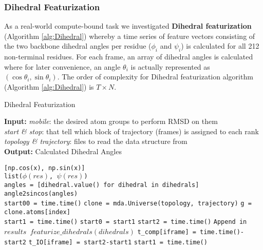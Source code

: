 \subsubsection{Dihedral Featurization}
As a real-world compute-bound task we investigated \textbf{Dihedral featurization} \citep{Sittel:2014aa} (Algorithm \ref{alg:Dihedral}) whereby a time series of
feature vectors consisting of the two backbone dihedral angles per residue ($\phi_{i}$ and $\psi_{i}$) is calculated for all 212
non-terminal residues. For each frame, an array of dihedral angles is calculated where for later convenience, an angle $\theta_{i}$ is
actually represented as $(\cos\theta_{i}, \sin\theta_{i})$. 
The order of complexity for Dihedral featurization algorithm (Algorithm \ref{alg:Dihedral}) is $T \times N$. 

\begin{algorithm}[t]
	\scriptsize
    \caption{Dihedral Featurization}
    \label{alg:Dihedral}
    \hspace*{\algorithmicindent} \textbf{Input:} \emph{mobile}: the desired atom groups to perform RMSD on them \\ 
    \hspace*{\algorithmicindent} \emph{start \& stop}: that tell which block of trajectory (frames) is assigned to each rank \\
    \hspace*{\algorithmicindent} \emph{topology \& trajectory}: files to read the data structure from \\
    \hspace*{\algorithmicindent} \textbf{Output:} Calculated Dihedral Angles
    \begin{algorithmic}[1]
        \State \Return \texttt{[np.cos(x), np.sin(x)]}
        \EndProcedure
        \\
        \State \texttt{list($\phi (res)$, $\psi (res)$)}
        \EndFor
        \EndProcedure
        \\
        \State \texttt{angles = [dihedral.value() for dihedral in dihedrals]}
        \State \Return \texttt{angle2sincos(angles)}
        \EndProcedure
        \\
        \State \texttt{start00 = time.time()}
        \State \texttt{clone = mda.Universe(topology, trajectory)}
        \State \texttt{g = clone.atoms[index]}
        \\
        \State \texttt{start1 = time.time()}
        \State \texttt{start0 = start1}
        \State \texttt{start2 = time.time()}
        \State \texttt{Append in $results$ $featurize\_dihedrals(dihedrals)$}
        \State \texttt{t\_comp[iframe] = time.time()-start2}
        \State \texttt{t\_IO[iframe] = start2-start1}
        \State \texttt{start1 = time.time()}
        \EndFor
        

\end{algorithmic}
\end{algorithm}
